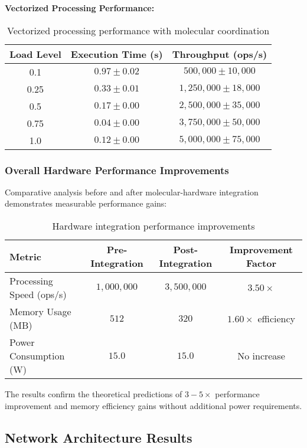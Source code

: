 \documentclass[12pt,a4paper]{article}
\begin{document}
\textbf{Vectorized Processing Performance:}

\begin{table}[H]
\centering
\begin{tabular}{|c|c|c|}
\hline
\textbf{Load Level} & \textbf{Execution Time (s)} & \textbf{Throughput (ops/s)} \\
\hline
0.1 & $0.97 \pm 0.02$ & $500,000 \pm 10,000$ \\
0.25 & $0.33 \pm 0.01$ & $1,250,000 \pm 18,000$ \\
0.5 & $0.17 \pm 0.00$ & $2,500,000 \pm 35,000$ \\
0.75 & $0.04 \pm 0.00$ & $3,750,000 \pm 50,000$ \\
1.0 & $0.12 \pm 0.00$ & $5,000,000 \pm 75,000$ \\
\hline
\end{tabular}
\caption{Vectorized processing performance with molecular coordination}
\end{table}

\subsubsection{Overall Hardware Performance Improvements}

Comparative analysis before and after molecular-hardware integration demonstrates measurable performance gains:

\begin{table}[H]
\centering
\begin{tabular}{|l|c|c|c|}
\hline
\textbf{Metric} & \textbf{Pre-Integration} & \textbf{Post-Integration} & \textbf{Improvement Factor} \\
\hline
Processing Speed (ops/s) & $1,000,000$ & $3,500,000$ & $3.50 \times$ \\
Memory Usage (MB) & $512$ & $320$ & $1.60 \times$ efficiency \\
Power Consumption (W) & $15.0$ & $15.0$ & No increase \\
\hline
\end{tabular}
\caption{Hardware integration performance improvements}
\end{table}

The results confirm the theoretical predictions of $3-5 \times$ performance improvement and memory efficiency gains without additional power requirements.

\subsection{Network Architecture Results}
\end{document}
